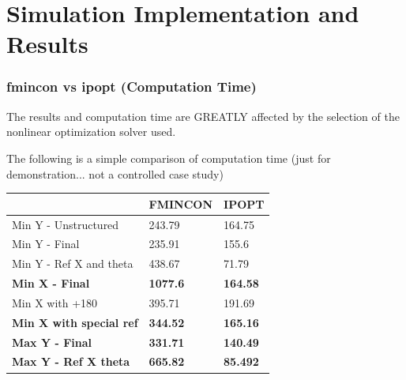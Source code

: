 \documentclass[aspectratio=169]{beamer}
\begin{document}
\section{Simulation Implementation and Results}
\begin{frame}
	\frametitle{fmincon vs ipopt (Computation Time)}

	The results and computation time are GREATLY affected by the selection of the nonlinear optimization solver used.

	The following is a simple comparison of computation time (just for demonstration... not a controlled case study)
	
	\begin{table}[]
		\begin{tabular}{|l|l|l|}
		\hline
		\textbf{}                       & \textbf{FMINCON} & \textbf{IPOPT}  \\ \hline
		Min Y - Unstructured            & 243.79           & 164.75          \\ \hline
		Min Y - Final                   & 235.91           & 155.6           \\ \hline
		Min Y - Ref X and theta         & 438.67           & 71.79           \\ \hline
		\textbf{Min X - Final}          & \textbf{1077.6}  & \textbf{164.58} \\ \hline
		Min X with +180                 & 395.71           & 191.69          \\ \hline
		\textbf{Min X with special ref} & \textbf{344.52}  & \textbf{165.16} \\ \hline
		\textbf{Max Y - Final}          & \textbf{331.71}  & \textbf{140.49} \\ \hline
		\textbf{Max Y - Ref X theta}    & \textbf{665.82}  & \textbf{85.492} \\ \hline
		\end{tabular}
		\end{table}

\end{frame}
\end{document}
